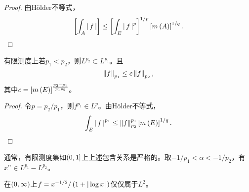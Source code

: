 \documentclass{ctexrep}
\begin{document}
  \begin{proof}
    由H\"{o}lder不等式，
    \[ \left[\int_A \left|\, f \,\right|\right] \le \left[\int_E \left|\, f \,\right|^p\right]^{1/p} \left[m\left(A\right)\right]^{1/q}. \qedhere \]
  \end{proof}
  \begin{collary}
    有限测度上若$p_1<p_2$，则$L^{p_2}\subset L^{p_1}$。且
    \[ \left\| f \right\|_{p_1} \le c\left\| f \right\|_{p_2}, \]
    其中$c=\left[m\left(E\right)\right]^{\frac{p_2-p_1}{p_1p_2}}$。
  \end{collary}
  \begin{proof}
    令$p=p_2/p_1$，则$f^{p_1}\in L^p$。由H\"{o}lder不等式，
    \[ \int_E \left|\, f \,\right|^{p_1} \le \left\| f \right\|^{p_1}_{p_2}\left[m\left(E\right)\right]^{1/q}. \qedhere \]
  \end{proof}
  \begin{ex}
    通常，有限测度集如$\left(0,1\right]$上上述包含关系是严格的。取$-1/p_1<\alpha<-1/p_2$，有$x^\alpha \in L^{p_1} - L^{p_2}$。
  \end{ex}
  \begin{ex}
    在$\left(0,\infty\right)$上$f=x^{-1/2}/\left(1+\left|\, \log x \,\right|\right)$仅仅属于$L^2$。
  \end{ex}
\end{document}
